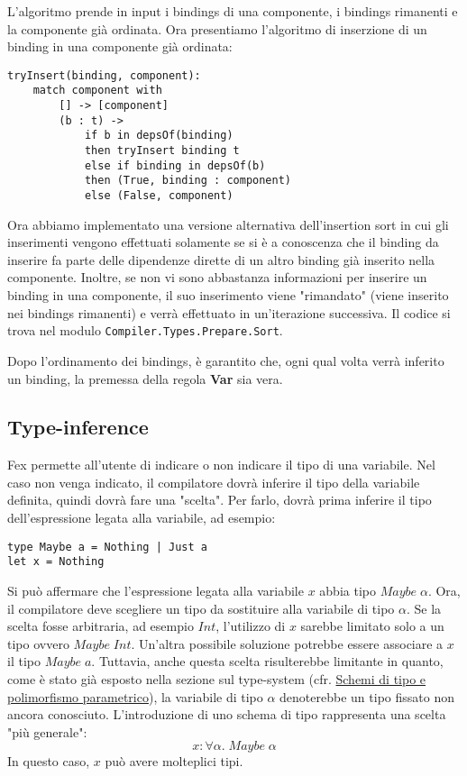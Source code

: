 \documentclass[10pt,a4paper]{article}
\begin{document}
L'algoritmo prende in input i bindings di una componente, i bindings rimanenti e la componente già ordinata. Ora
presentiamo l'algoritmo di inserzione di un binding in una componente già ordinata:
\begin{lstlisting}
tryInsert(binding, component):
    match component with
        [] -> [component]
        (b : t) ->
            if b in depsOf(binding)
            then tryInsert binding t
            else if binding in depsOf(b)
            then (True, binding : component)
            else (False, component)
\end{lstlisting}
Ora abbiamo implementato una versione alternativa dell'insertion sort in cui gli inserimenti vengono effettuati
solamente se si è a conoscenza che il binding da inserire fa parte delle dipendenze dirette di un altro binding già
inserito nella componente. Inoltre, se non vi sono abbastanza informazioni per inserire un binding in una componente,
il suo inserimento viene "rimandato" (viene inserito nei bindings rimanenti) e verrà effettuato in un'iterazione
successiva. Il codice si trova nel modulo \texttt{Compiler.Types.Prepare.Sort}.

Dopo l'ordinamento dei bindings, è garantito che, ogni qual volta verrà inferito un binding, la premessa
della regola \textbf{Var} sia vera.

\hypertarget{Type-inference}{\subsection{Type-inference}}
Fex permette all'utente di indicare o non indicare il tipo di una variabile. Nel caso non venga indicato, il
compilatore dovrà inferire il tipo della variabile definita, quindi dovrà fare una "scelta". Per farlo, dovrà prima
inferire il tipo dell'espressione legata alla variabile, ad esempio:
\begin{lstlisting}
type Maybe a = Nothing | Just a
let x = Nothing
\end{lstlisting}
Si può affermare che l'espressione legata alla variabile $ x $ abbia tipo $ Maybe \; \alpha $. Ora, il compilatore
deve scegliere un tipo da sostituire alla variabile di tipo $ \alpha $. Se la scelta fosse arbitraria, ad esempio
$ Int $, l'utilizzo di $ x $ sarebbe limitato solo a un tipo ovvero $ Maybe \; Int $. Un'altra possibile soluzione
potrebbe essere associare a $ x $ il tipo $ Maybe \; a $. Tuttavia, anche questa scelta risulterebbe limitante in quanto,
come è stato già esposto nella sezione sul type-system
(cfr. \hyperlink{Schemi di tipo e polimorfismo parametrico}{Schemi di tipo e polimorfismo parametrico}), la variabile di
tipo $ \alpha $ denoterebbe un tipo fissato non ancora conosciuto. L'introduzione di uno schema di tipo rappresenta una
scelta "più generale":
\[ x : \forall \alpha. \; Maybe \; \alpha \]
In questo caso, $ x $ può avere molteplici tipi.
\end{document}
